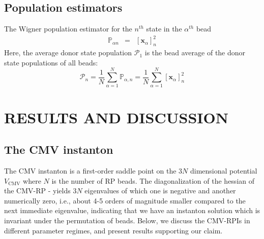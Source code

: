 \documentclass[%
 aip,
 jmp,%
 amsmath,amssymb,
reprint,%
]{revtex4-1}
\begin{document}
\subsection{\label{ssec:level4C}Population estimators}
The Wigner population estimator for the $n^{th}$ state in the $\alpha^{th}$ bead 
\begin{eqnarray}
\mathbb{P}_{\alpha n} & = & \left[\mathbf{x}_{\alpha}\right]_{n}^2
\end{eqnarray}
Here, the average donor state population $\mathcal{P}_{1}$ is the bead average of the donor state populations of all beads:
\begin{equation}
\mathcal{P}_{n} = \dfrac{1}{N}\sum_{\alpha=1}^{N} \mathbb{P}_{\alpha,n} = \dfrac{1}{N}\sum_{\alpha=1}^{N}\left[\mathbf{x}_{\alpha}\right]_{n}^2
\end{equation}
\section{\label{sec:level5}RESULTS AND DISCUSSION}
\subsection{\label{ssec:level5A}The CMV instanton}
 The CMV instanton is a first-order saddle point on the $3N$ dimensional potential $V_{\mathrm{CMV}}$ where $N$ is the number of RP beads. The diagonalization of the hessian of the CMV-RP - yields $3N$ eigenvalues of which one is negative and another numerically zero, i.e., about 4-5 orders of magnitude smaller compared to the next immediate eigenvalue, indicating that we have an instanton solution which is invariant under the permutation of beads. Below, we discuss the CMV-RPIs in different parameter regimes, and present results supporting our claim. 
\end{document}

